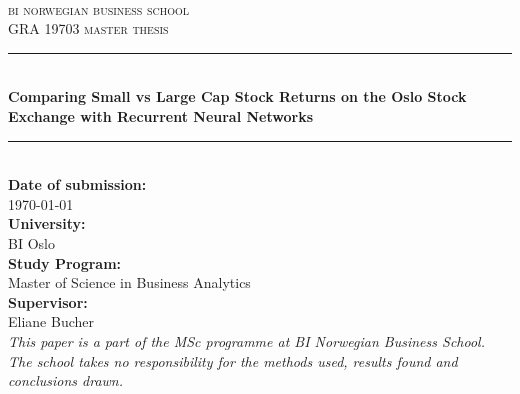\begin{titlepage}

\newcommand{\HRule}{\color{rockwoolcolor}\rule{\linewidth}{0.75mm}\color{black}} %

\center %
 
\ \\[1.5cm]
\textsc{\LARGE bi norwegian business school}\\[1.5cm] %
\textsc{\Large GRA 19703
master thesis}\\[1.5cm] %



\HRule \\[0.4cm]
{ \LARGE \bfseries Comparing Small vs Large Cap Stock Returns on the Oslo Stock Exchange with Recurrent Neural Networks \\[0.5cm]} %
\HRule \\[1.5cm]
 

{\large \textbf{Date of submission:}\\  \today}\\[0.5cm] %
{\large \textbf{University:}\\  BI Oslo}\\[0.5cm] %
{\large \textbf{Study Program:}\\  Master of Science in Business Analytics}\\[0.5cm]
{\large \textbf{Supervisor:}\\  Eliane Bucher}\\[0.5cm]   

\textit{This paper is a part of the MSc programme at BI Norwegian Business School. The school takes no
responsibility for the methods used, results found and conclusions drawn.}
\vfill %

\end{titlepage}